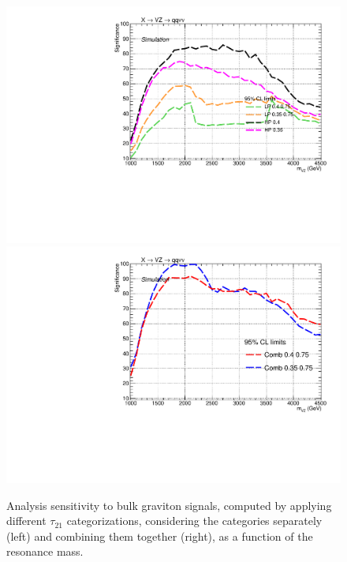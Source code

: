  \begin{figure}[!htb]
   \begin{center}
     \includegraphics[width=.5\textwidth]{TestPurity/Significance_purityTest_LPHP_test_tesi.pdf}%
     \includegraphics[width=.5\textwidth]{TestPurity/Significance_purityTest_comb_test_tesi.pdf}

   \end{center}
   \caption{Analysis sensitivity to bulk graviton signals, computed by applying different $\tau_{21}$ categorizations, considering the categories separately (left) and combining them together (right), as a function of the resonance mass.}
   \label{fig:test_significance}
 \end{figure}

